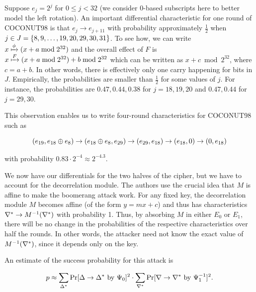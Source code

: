 \documentclass[twoside]{article}
\begin{document}
Suppose \(e_j = 2^j\) for \(0 \le j < 32\) (we consider 0-based subscripts here
to better model the left rotation). An important differential characteristic for
one round of COCONUT98 is that \(e_j \rightarrow e_{j + 11}\) with probability
approximately \(\frac{1}{2}\) when \(j \in J =
\{8,9,\ldots,19,20,29,30,31\}\). To see how, we can write \(x \xmapsto{\phi}
(x + a \bmod 2^{32})\) and the overall effect of \(F\) is \(x \xmapsto{F}
(x + a \bmod 2^{32}) + b \bmod 2^{32}\) which can be written as \(x + c
\bmod 2^{32}\), where \(c = a + b\). In other words, there is effectively only
one carry happening for bits in \(J\). Empirically, the probabilities are
smaller than \(\frac{1}{2}\) for some values of \(j\). For instance, the
probabilities are \(0.47,0.44,0.38\) for \(j = 18,19,20\) and \(0.47,0.44\) for
\(j = 29,30\).

This observation enables us to write four-round characteristics for COCONUT98
such as 

\begin{equation}
    (e_{19}, e_{18} \oplus e_8) \rightarrow (e_{18} \oplus e_{8}, e_{29}) \rightarrow (e_{29}, e_{18}) \rightarrow (e_{18}, 0) \rightarrow (0, e_{18})
    \label{eq:coconut-char}
\end{equation} 

with probability \(0.83 \cdot 2^{-4} \approx 2^{-4.3}\).

We now have our differentials for the two halves of the cipher, but we have to
account for the decorrelation module. The authors use the crucial idea that
\(M\) is affine to make the boomerang attack work. For any fixed key, the
decorrelation module \(M\) becomes affine (of the form \(y = mx + c\)) and thus
has characteristics \(\nabla^* \rightarrow M^{-1}(\nabla^*)\) with
probability 1. Thus, by absorbing \(M\) in either \(E_0\) or \(E_1\), there will
be no change in the probabilities of the respective characteristics over half
the rounds. In other words, the attacker need not know the exact value of
\(M^{-1}(\nabla^*)\), since it depends only on the key.

An estimate of the success probability for this attack is 

\begin{equation}
    p \approx \sum_{\Delta^*}\Pr[\Delta \rightarrow \Delta^* \textrm{ by } \Psi_0]^2 \cdot \sum_{\nabla^*}\Pr[\nabla \rightarrow \nabla^* \textrm{ by } \Psi_1^{-1}]^2.
    \label{eq:coconut-p-approx}
\end{equation}
\end{document}
